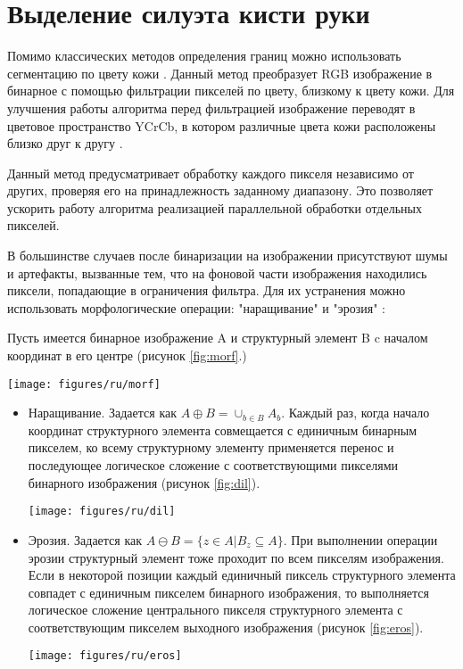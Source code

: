 \section{Выделение силуэта кисти руки}
\label{sec:Threholding}

Помимо классических методов определения границ можно использовать сегментацию по цвету кожи \cite{Phung}. Данный метод преобразует RGB изображение в бинарное с помощью фильтрации пикселей по цвету, близкому к цвету кожи. Для улучшения работы алгоритма перед фильтрацией изображение переводят в цветовое пространство YCrCb, в котором различные цвета кожи  расположены близко друг к другу \cite{Siddharth}.

Данный метод предусматривает обработку каждого пикселя независимо от других, проверяя его на принадлежность заданному диапазону. Это позволяет ускорить работу алгоритма реализацией параллельной обработки отдельных пикселей.

В большинстве случаев после бинаризации на изображении присутствуют шумы и артефакты, вызванные тем, что на фоновой части изображения находились пиксели, попадающие в ограничения фильтра. Для их устранения можно использовать морфологические операции: "наращивание" и "эрозия" \cite{DIP}:

Пусть имеется бинарное изображение A и структурный элемент B c началом координат в его центре (рисунок \ref{fig:morf}.)

	\begin{figure*}[!h]
	\centering
	\texttt{[image: figures/ru/morf]}
	\caption{Бинарное изображение и структурный элемент}
	\label{fig:morf}
\end{figure*}

\begin{itemize}
	\item Наращивание. Задается как $A \oplus B = \cup_{b \in B}A_b$. Каждый раз, когда начало координат структурного элемента совмещается с единичным бинарным пикселем, ко всему структурному элементу применяется перенос и последующее логическое сложение с соответствующими пикселями бинарного изображения (рисунок \ref{fig:dil}).
	
	\begin{figure*}[!h]
		\centering
		\texttt{[image: figures/ru/dil]}
		\caption{Наращивание бинарного изображения A структурным элементом B}
		\label{fig:dil}
	\end{figure*}
	
	\item Эрозия. Задается как $A \ominus B = \{ z \in A | B_z \subseteq A \}$. При выполнении операции эрозии структурный элемент тоже проходит по всем пикселям изображения. Если в некоторой позиции каждый единичный пиксель структурного элемента совпадет с единичным пикселем бинарного изображения, то выполняется логическое сложение центрального пикселя структурного элемента с соответствующим пикселем выходного изображения (рисунок \ref{fig:eros}).
	
	\begin{figure*}[!h]
		\centering
		\texttt{[image: figures/ru/eros]}
		\caption{Эрозия бинарного изображения A структурным элементом B}
		\label{fig:eros}
	\end{figure*}
\end{itemize}